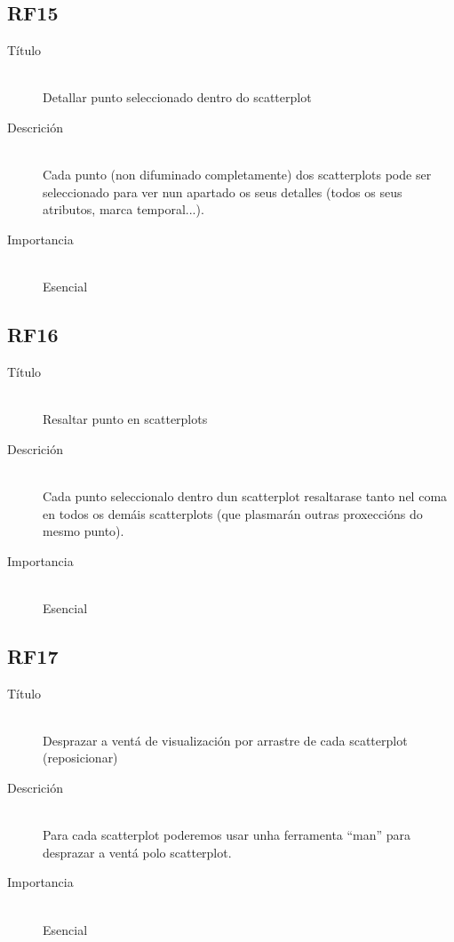 \subsection*{RF15}
\begin{description}
\item[Título] \hfill \\
Detallar punto seleccionado dentro do scatterplot
\item[Descrición] \hfill \\
Cada punto (non difuminado completamente) dos scatterplots pode ser seleccionado para ver nun apartado os seus detalles (todos os seus atributos, marca temporal...).
\item[Importancia] \hfill \\
Esencial
\end{description}

\subsection*{RF16}
\begin{description}
\item[Título] \hfill \\
Resaltar punto en scatterplots
\item[Descrición] \hfill \\
Cada punto seleccionalo dentro dun scatterplot resaltarase tanto nel coma en todos os demáis scatterplots (que plasmarán outras proxeccións do mesmo punto).
\item[Importancia] \hfill \\
Esencial
\end{description}

\subsection*{RF17}
\begin{description}
\item[Título] \hfill \\
Desprazar a ventá de visualización por arrastre de cada scatterplot (reposicionar)
\item[Descrición] \hfill \\
Para cada scatterplot poderemos usar unha ferramenta ``man'' para desprazar a ventá polo scatterplot.
\item[Importancia] \hfill \\
Esencial
\end{description}

